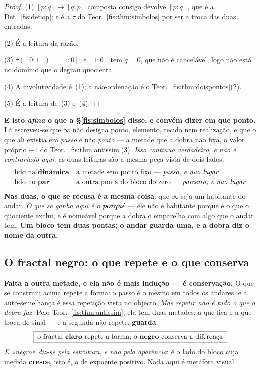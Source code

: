 \documentclass[livro.tex]{subfiles}
\begin{document}
\begin{proof}
(1) $[p:q]\mapsto[q:p]$ composta consigo devolve $[p:q]$, que é a
Def.~\ref{fis:def:op}; e é a $\tau$ do Teor.~\ref{fis:thm:simbolos} por ser a
troca das duas entradas.

(2) É a leitura da razão.

(3) $\tau([0:1])=[1:0]$; e $[1:0]$ tem $q=0$, que não é cancelável, logo não está
no domínio que o degrau quocienta.

(4) A involutividade é~(1); a não-ordenação é o Teor.~\ref{fis:thm:doispontos}(2).

(5) É a leitura de~(3) e~(4).
\end{proof}


\medskip\noindent\textbf{E isto \emph{afina} o que a §\ref{fis:simbolos} disse, e
convém dizer em que ponto.} Lá escreveu-se que $\infty$ não designa ponto,
elemento, tecido nem realização, e que o que ali existia era \emph{passo} e não
\emph{ponto} --- a metade que a dobra não fixa, o valor próprio $-1$ do
Teor.~\ref{fis:thm:antissim}(3). \emph{Isso continua verdadeiro, e não é
contrariado aqui}: as duas leituras são a mesma peça vista de dois lados.
\[
\begin{array}{ll}
\text{lido na \textbf{dinâmica}} & \text{a metade sem ponto fixo --- \emph{passo, e não lugar}}\\[2pt]
\text{lido no \textbf{par}} & \text{a outra ponta do bloco do zero --- \emph{parceiro, e não lugar}}
\end{array}
\]
\textbf{Nas duas, o que se recusa é a mesma coisa}: que $\infty$ seja um habitante
do andar. \emph{O que se ganha aqui é o \textbf{porquê}} --- ele não é habitante
porque é o que o quociente exclui, e é nomeável porque a dobra o emparelha com
algo que o andar tem. \textbf{Um bloco tem duas pontas; o andar guarda uma, e a
dobra diz o nome da outra.}

\subsection*{O fractal negro: o que repete e o que conserva}

\noindent\textbf{Falta a outra metade, e ela não é mais indução --- é
conservação.} O que se construiu acima repete a forma: o passo é o mesmo em todos
os andares, e a auto-semelhança é essa repetição vista no objecto. \emph{Mas
repetir não é tudo o que a dobra faz.} Pelo Teor.~\ref{fis:thm:antissim}, ela
tem duas metades: a que fica e a que troca de sinal --- e a segunda não repete,
\textbf{guarda}.
\[
\boxed{\;\text{o fractal \textbf{claro} repete a forma; o \textbf{negro} conserva a diferença}\;}
\]
\emph{E «negro» diz-se pela estrutura, e não pela aparência}: é o lado do bloco
cuja medida \textbf{cresce}, isto é, o de expoente positivo. Nada aqui é
metáfora visual.
\end{document}
